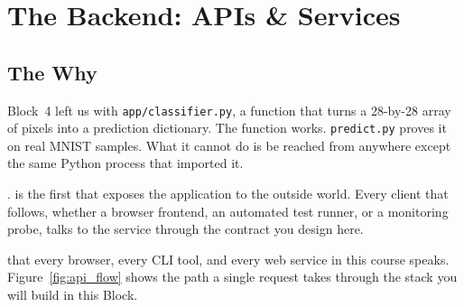 

\chapter{The Backend: APIs \& Services}


\section{The Why}

Block~4 left us with \texttt{app/classifier.py}, a function that turns
a 28-by-28 array of pixels into a prediction dictionary.
The function works.
\texttt{predict.py} proves it on real MNIST samples.
What it cannot do is be reached from anywhere except the same Python
process that imported it.

.
is the first that exposes the application to the outside world.
Every client that follows, whether a browser frontend, an automated test
runner, or a monitoring probe, talks to the service through the contract
you design here.

 that every browser, every CLI tool,
and every web service in this course speaks.
Figure~\ref{fig:api_flow} shows the path a single request takes through
the stack you will build in this Block.


